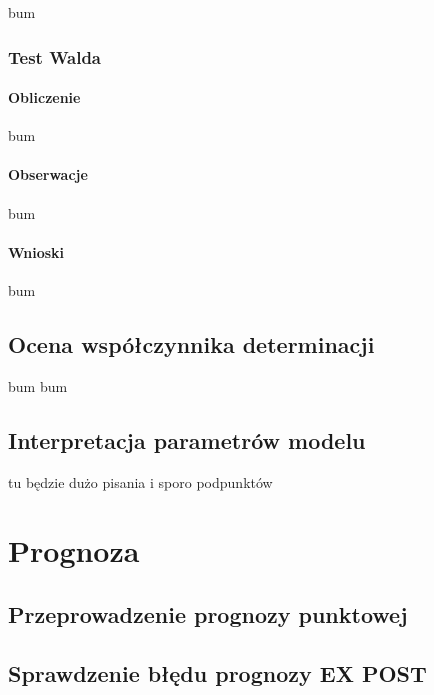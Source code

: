 \documentclass[
  11pt,
]{article}
\begin{document}
bum

\subsubsection{Test Walda}\label{test-walda}

\paragraph{Obliczenie}\label{obliczenie-13}

bum

\paragraph{Obserwacje}\label{obserwacje-17}

bum

\paragraph{Wnioski}\label{wnioski-17}

bum

\subsection{Ocena współczynnika
determinacji}\label{ocena-wspuxf3ux142czynnika-determinacji}

bum bum

\subsection{Interpretacja parametrów
modelu}\label{interpretacja-parametruxf3w-modelu}

tu będzie dużo pisania i sporo podpunktów

\section{Prognoza}\label{prognoza}

\subsection{Przeprowadzenie prognozy
punktowej}\label{przeprowadzenie-prognozy-punktowej}

\subsection{Sprawdzenie błędu prognozy EX
POST}\label{sprawdzenie-bux142ux119du-prognozy-ex-post}
\end{document}
